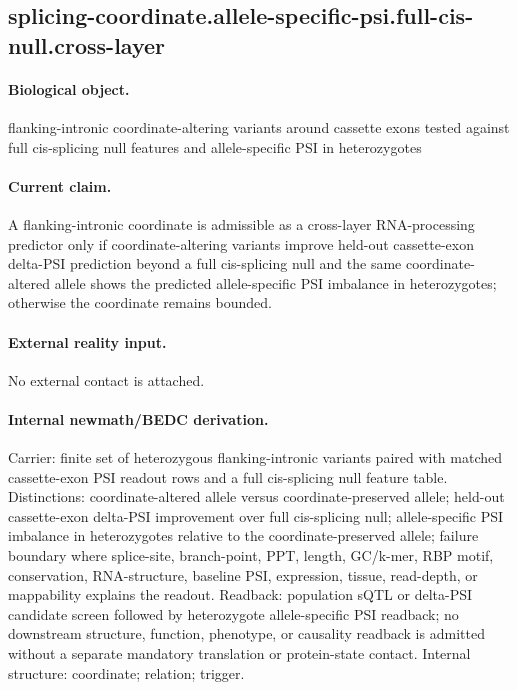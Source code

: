 \subsection{splicing-coordinate.allele-specific-psi.full-cis-null.cross-layer}

\paragraph{Biological object.} flanking-intronic coordinate-altering variants around cassette exons tested against full cis-splicing null features and allele-specific PSI in heterozygotes

\paragraph{Current claim.} A flanking-intronic coordinate is admissible as a cross-layer RNA-processing predictor only if coordinate-altering variants improve held-out cassette-exon delta-PSI prediction beyond a full cis-splicing null and the same coordinate-altered allele shows the predicted allele-specific PSI imbalance in heterozygotes; otherwise the coordinate remains bounded.

\paragraph{External reality input.}
No external contact is attached.

\paragraph{Internal newmath/BEDC derivation.} Carrier: finite set of heterozygous flanking-intronic variants paired with matched cassette-exon PSI readout rows and a full cis-splicing null feature table. Distinctions: coordinate-altered allele versus coordinate-preserved allele; held-out cassette-exon delta-PSI improvement over full cis-splicing null; allele-specific PSI imbalance in heterozygotes relative to the coordinate-preserved allele; failure boundary where splice-site, branch-point, PPT, length, GC/k-mer, RBP motif, conservation, RNA-structure, baseline PSI, expression, tissue, read-depth, or mappability explains the readout. Readback: population sQTL or delta-PSI candidate screen followed by heterozygote allele-specific PSI readback; no downstream structure, function, phenotype, or causality readback is admitted without a separate mandatory translation or protein-state contact. Internal structure: coordinate; relation; trigger.

